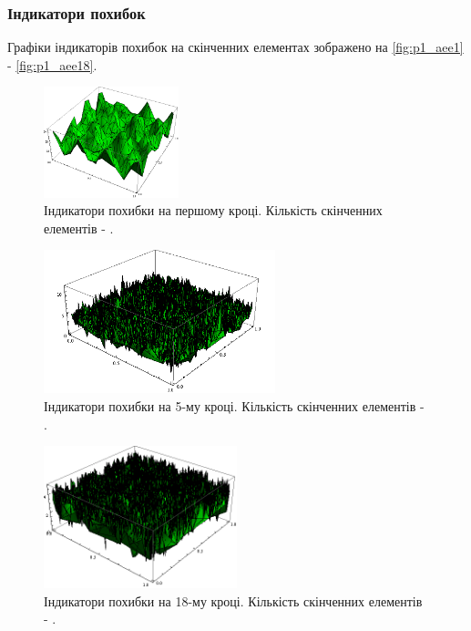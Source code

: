 \begin{frame}[allowframebreaks]
	\frametitle<presentation>{Індикатори похибок}
		Графіки індикаторів похибок на скінченних елементах зображено на \autoref{fig:p1_aee1} - \autoref{fig:p1_aee18}.
		\begin{figure}[H]
			\centering
		    \includegraphics[width=0.35\textwidth]{problem1/my/AEE/1}
		    \caption{Індикатори похибки на першому кроці. Кількість скінченних елементів - .}
		    \label{fig:p1_aee1}
		\end{figure}

		\begin{figure}[H]
			\centering
		    \includegraphics[width=0.6\textwidth]{problem1/my/AEE/5}
		    \caption{Індикатори похибки на 5-му кроці. Кількість скінченних елементів - .}
		    \label{fig:p1_aee5}
		\end{figure}

		\begin{figure}[H]
			\centering
		    \includegraphics[width=0.5\textwidth]{problem1/my/AEE/18}
		    \caption{Індикатори похибки на 18-му кроці. Кількість скінченних елементів - .}
		    \label{fig:p1_aee18}
		\end{figure}

\end{frame}





